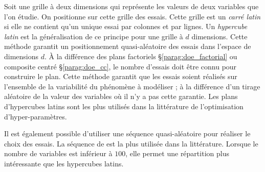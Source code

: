Soit une grille à deux dimensions qui représente les valeurs de deux variables que l'on étudie.
On positionne sur cette grille des essais.
Cette grille est un \textit{carré latin} si elle ne contient qu'un unique essai par colonnes et par lignes.
Un \textit{hypercube latin} est la généralisation de ce principe pour une grille à $d$ dimensions.
Cette méthode garantit un positionnement quasi-aléatoire des essais dans l'espace de dimensions $d$.
À la différence des plans factoriels §\ref{parag:doe_factorial} ou composite centré §\ref{parag:doe_cc}, le nombre d'essais doit être connu pour construire le plan.
Cette méthode garantit que les essais soient réalisés sur l'ensemble de la variabilité du phénomène à modéliser ; à la différence d'un tirage aléatoire de la valeur des variables où il n'y a pas cette garantie.
Les plans d'hypercubes latins sont les plus utilisés dans la littérature de l'optimisation d'hyper-paramètres.

Il est également possible d'utiliser une séquence quasi-aléatoire pour réaliser le choix des essais.
La séquence de \citeauthor{sobol_distribution_1967} \cite{sobol_distribution_1967} est la plus utilisée dans la littérature.
Lorsque le nombre de variables est inférieur à $100$, elle permet une répartition plus intéressante que les hypercubes latins.

